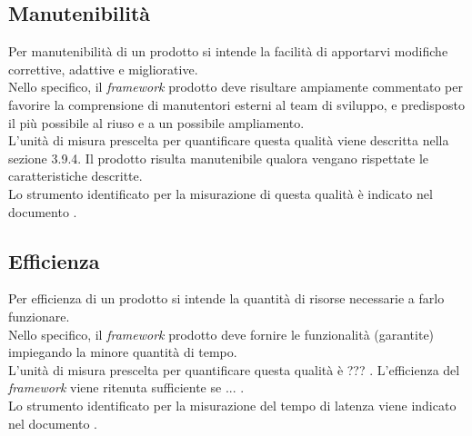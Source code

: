 	\subsection{Manutenibilità}
		Per manutenibilità di un prodotto si intende la facilità di apportarvi modifiche correttive, adattive e migliorative.\\
		Nello specifico, il \textit{framework} prodotto deve risultare ampiamente commentato per favorire la comprensione di manutentori esterni al team di sviluppo, e predisposto il più possibile al riuso e a un possibile ampliamento.\\
		L'unità di misura prescelta per quantificare questa qualità viene descritta nella sezione 3.9.4. Il prodotto risulta manutenibile qualora vengano rispettate le caratteristiche descritte.\\
		Lo strumento identificato per la misurazione di questa qualità è indicato nel documento .
	\subsection{Efficienza}
		Per efficienza di un prodotto si intende la quantità di risorse necessarie a farlo funzionare.\\
		Nello specifico, il \textit{framework} prodotto deve fornire le funzionalità (garantite) impiegando la minore quantità di tempo.\\
		L'unità di misura prescelta per quantificare questa qualità è ??? . L'efficienza del \textit{framework} viene ritenuta sufficiente se ... .\\
		Lo strumento identificato per la misurazione del tempo di latenza viene indicato nel documento .